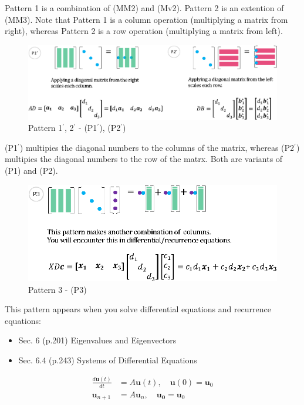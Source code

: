 \documentclass[letterpaper]{article}
\begin{document}
Pattern 1 is a combination of (MM2) and (Mv2).
Pattern 2 is an extention of (MM3). Note that Pattern 1 is a column operation (multiplying a matrix from right),
whereas Pattern 2 is a row operation (multiplying a matrix from left).

\begin{figure}[H]
  \centering
  \includegraphics[scale=0.8]{Pattern11-22.eps}
  \caption{Pattern 1$^\prime$, 2$^\prime$ - (P1$^\prime$), (P2$^\prime$)}
\end{figure}

(P1$^\prime$) multipies the diagonal numbers to the columns of the matrix,
whereas (P2$^\prime$) multipies the diagonal numbers to the row of the matrx.
Both are variants of (P1) and (P2).

\begin{figure}[H]
  \centering
  \includegraphics[scale=0.85]{Pattern3.eps}
  \caption{Pattern 3 - (P3)}
\end{figure}

This pattern appears when you solve differential equations and recurrence equations:

\begin{itemize}
  \item Sec. 6 (p.201) Eigenvalues and Eigenvectors
  \item Sec. 6.4 (p.243) Systems of Differential Equations
\end{itemize} 

\begin{align*}
  \frac{d \bm{u}(t) }{dt} &= A \bm{u}(t), \quad \bm{u}(0)=\bm{u}_0\\
  \bm{u}_{n+1} &= A \bm{u}_n, \quad \bm{u_0} = \bm{u}_0
\end{align*}
\end{document}
